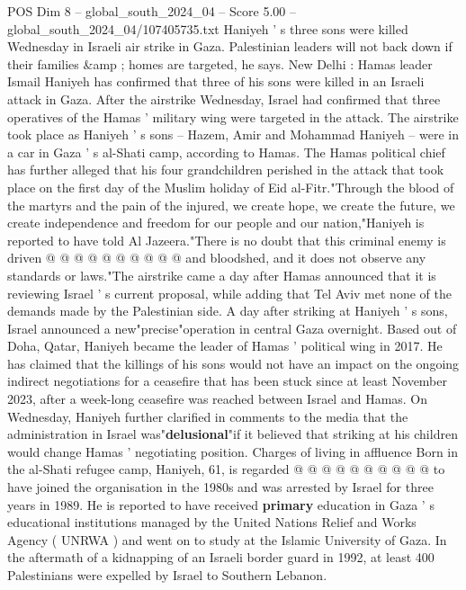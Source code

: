 \begin{textsample}{POS Dim 8 – global\_south\_2024\_04 – Score 5.00 – global\_south\_2024\_04/107405735.txt}  \label{ex:f8_pos_197}
Haniyeh ' s three sons were killed Wednesday in Israeli air strike in Gaza.
Palestinian leaders will not back down if their families \&amp ; homes are targeted, he says.
New Delhi : Hamas leader Ismail Haniyeh has confirmed that three of his sons were killed in an Israeli attack in Gaza.
After the airstrike Wednesday, Israel had confirmed that three operatives of the Hamas ' military wing were targeted in the attack.
The airstrike took place as Haniyeh ' s sons -- Hazem, Amir and Mohammad Haniyeh -- were in a car in Gaza ' s al-Shati camp, according to Hamas.
The Hamas political chief has further alleged that his four grandchildren perished in the attack that took place on the first day of the Muslim holiday of Eid al-Fitr."Through the blood of the martyrs and the pain of the injured, we create hope, we create the future, we create independence and freedom for our people and our nation,"Haniyeh is reported to have told Al Jazeera."There is no doubt that this criminal enemy is driven @ @ @ @ @ @ @ @ @ @ and bloodshed, and it does not observe any standards or laws."The airstrike came a day after Hamas announced that it is reviewing Israel ' s current proposal, while adding that Tel Aviv met none of the demands made by the Palestinian side.
A day after striking at Haniyeh ' s sons, Israel announced a new"precise"operation in central Gaza overnight.
Based out of Doha, Qatar, Haniyeh became the leader of Hamas ' political wing in 2017.
He has claimed that the killings of his sons would not have an impact on the ongoing indirect negotiations for a ceasefire that has been stuck since at least November 2023, after a week-long ceasefire was reached between Israel and Hamas.
On Wednesday, Haniyeh further clarified in comments to the media that the administration in Israel was"\textbf{delusional}"if it believed that striking at his children would change Hamas ' negotiating position.
Charges of living in affluence Born in the al-Shati refugee camp, Haniyeh, 61, is regarded @ @ @ @ @ @ @ @ @ @ to have joined the organisation in the 1980s and was arrested by Israel for three years in 1989.
He is reported to have received \textbf{primary} education in Gaza ' s educational institutions managed by the United Nations Relief and Works Agency ( UNRWA ) and went on to study at the Islamic University of Gaza.
In the aftermath of a kidnapping of an Israeli border guard in 1992, at least 400 Palestinians were expelled by Israel to Southern Lebanon.

\end{textsample}
